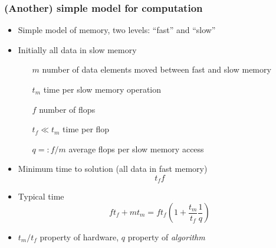 \documentclass[dvipsnames,presentation,aspectratio=169,14pt]{beamer}
\begin{document}
\begin{frame}
  \frametitle{(Another) simple model for computation}
  \begin{itemize}
  \item Simple model of memory, two levels: ``fast'' and ``slow''
  \item Initially all data in slow memory
    \begin{itemize}
    \item[$m$] number of data elements moved between fast and slow memory
    \item[$t_m$] time per slow memory operation
    \item[$f$] number of flops
    \item[$t_f \ll t_m$] time per flop
    \item[$q =: f/m$] average flops per slow memory access
    \end{itemize}
  \item Minimum time to solution (all data in fast memory)
    \begin{equation*}
      t_f f
    \end{equation*}
  \item Typical time
    \begin{equation*}
      f t_f + m t_m = f t_f \left(1 + \frac{t_m}{t_f}\frac{1}{q}\right)
    \end{equation*}

  \item $t_m / t_f$ property of hardware, $q$ property of \emph{algorithm}
  \end{itemize}
\end{frame}
\end{document}
